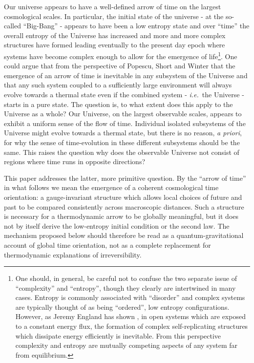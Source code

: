 \documentclass[preprint]{SciPost}
\newcommand{\ie}{\textit{i.e.}~}
\theoremstyle{plain} %
\begin{document}
Our universe appears to have a well-defined arrow of time on the largest cosmological scales. In particular, the initial state of the universe - at the so-called ``Big-Bang'' - appears to have been a low entropy state and over ``time'' the overall entropy of the Universe has increased and more and more complex structures have formed leading eventually to the present day epoch where systems have become complex enough to allow for the emergence of life\footnote{One should, in general, be careful not to confuse the two separate issue of ``complexity'' and ``entropy'', though they clearly are intertwined in many cases. Entropy is commonly associated with ``disorder'' and complex systems are typically thought of as being ``ordered'', low entropy configurations. However, as Jeremy England has shown \cite{England2012Statistical}, in open systems which are exposed to a constant energy flux, the formation of complex self-replicating structures which dissipate energy efficiently is inevitable. From this perspective complexity and entropy are mutually competing aspects of any system far from equilibrium.}. One could argue that from the perspective of Popescu, Short and Winter \cite{Popescu2006Entanglement} that the emergence of an arrow of time is inevitable in any subsystem of the Universe and that any such system coupled to a sufficiently large environment will always evolve towards a thermal state even if the combined system - \ie the Universe - starts in a pure state. The question is, to what extent does this apply to the Universe as a whole? Our Universe, on the largest observable scales, appears to exhibit a uniform sense of the flow of time. Individual isolated subsystems of the Universe might evolve towards a thermal state, but there is no reason, \emph{a priori}, for why the sense of time-evolution in these different subsystems should be the same. This raises the question why does the observable Universe not consist of regions where time runs in opposite directions? 

This paper addresses the latter, more primitive question. By the ``arrow of time'' in what follows we mean the emergence of a coherent cosmological time orientation: a gauge-invariant structure which allows local choices of future and past to be compared consistently across macroscopic distances. Such a structure is necessary for a thermodynamic arrow to be globally meaningful, but it does not by itself derive the low-entropy initial condition or the second law. The mechanism proposed below should therefore be read as a quantum-gravitational account of global time orientation, not as a complete replacement for thermodynamic explanations of irreversibility.
\end{document}
